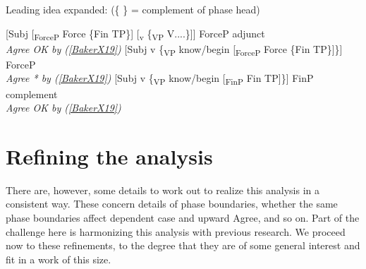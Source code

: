 \documentclass[output=paper,colorlinks,citecolor=brown,
]{langscibook}
\begin{document}
\begin{exe}
    \ex Leading idea expanded: (\{ \} = complement of phase head) \label{BakerX20}
        \begin{xlist}
        \ex \label{BakerX20a}
			 [Subj [\textsubscript{ForceP} Force \{Fin TP\}] [\textsubscript{v} \{\textsubscript{VP} V....\}]] ForceP adjunct
		           	\\
		        	\hspace*{9em} \textit{Agree OK by (\ref{BakerX19})}
		\vspace{16pt}
		\ex \label{BakerX20b}
			[Subj v \{\textsubscript{VP} know/begin [\textsubscript{ForceP} Force \{Fin TP\}]\}] ForceP
		           	\\
		        	\hspace*{16.5em} \textit{Agree * by (\ref{BakerX19})}
		\vspace{16pt}
		\ex \label{BakerX20c}
		    [Subj v \{\textsubscript{VP} know/begin [\textsubscript{FinP} Fin TP]\}] FinP complement
		           	\\
		        	\hspace*{13em} \textit{Agree OK by (\ref{BakerX19})}
		\vspace{16pt}
        \end{xlist}
\end{exe}

\section{Refining the analysis}

There are, however, some details to work out to realize this analysis in a consistent way. These concern details of phase boundaries, whether the same phase boundaries affect dependent case and upward Agree, and so on. Part of the challenge here is harmonizing this analysis with previous research. We proceed now to these refinements, to the degree that they are of some general interest and fit in a work of this size.\\
\end{document}
